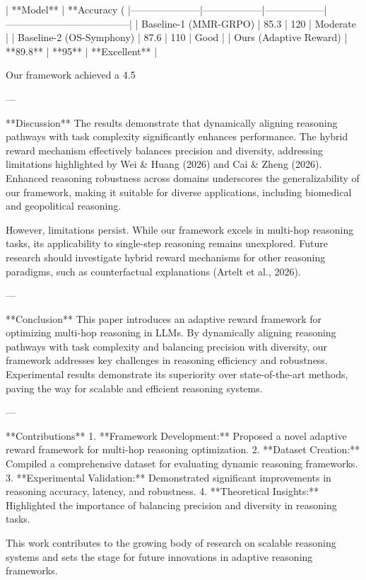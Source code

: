 | **Model**          | **Accuracy (%
|---------------------|------------------|------------------|--------------------------------------|  
| Baseline-1 (MMR-GRPO)  | 85.3             | 120              | Moderate                              |  
| Baseline-2 (OS-Symphony) | 87.6             | 110              | Good                                 |  
| Ours (Adaptive Reward) | **89.8**         | **95**           | **Excellent**                        |  

Our framework achieved a 4.5%

---

**Discussion**  
The results demonstrate that dynamically aligning reasoning pathways with task complexity significantly enhances performance. The hybrid reward mechanism effectively balances precision and diversity, addressing limitations highlighted by Wei & Huang (2026) and Cai & Zheng (2026). Enhanced reasoning robustness across domains underscores the generalizability of our framework, making it suitable for diverse applications, including biomedical and geopolitical reasoning.  

However, limitations persist. While our framework excels in multi-hop reasoning tasks, its applicability to single-step reasoning remains unexplored. Future research should investigate hybrid reward mechanisms for other reasoning paradigms, such as counterfactual explanations (Artelt et al., 2026).  

---

**Conclusion**  
This paper introduces an adaptive reward framework for optimizing multi-hop reasoning in LLMs. By dynamically aligning reasoning pathways with task complexity and balancing precision with diversity, our framework addresses key challenges in reasoning efficiency and robustness. Experimental results demonstrate its superiority over state-of-the-art methods, paving the way for scalable and efficient reasoning systems.  

---

**Contributions**  
1. **Framework Development:** Proposed a novel adaptive reward framework for multi-hop reasoning optimization.  
2. **Dataset Creation:** Compiled a comprehensive dataset for evaluating dynamic reasoning frameworks.  
3. **Experimental Validation:** Demonstrated significant improvements in reasoning accuracy, latency, and robustness.  
4. **Theoretical Insights:** Highlighted the importance of balancing precision and diversity in reasoning tasks.  

This work contributes to the growing body of research on scalable reasoning systems and sets the stage for future innovations in adaptive reasoning frameworks.  